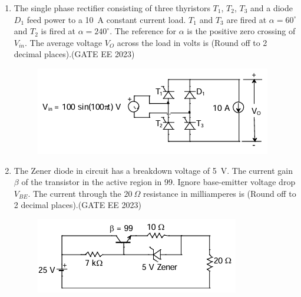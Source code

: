 \documentclass[a4paper,12pt]{exam}
\theoremstyle{remark}
\begin{document}
\begin{enumerate}
\item The single phase rectifier consisting of three thyristors $T_1$, $T_2$, $T_3$ and a diode $D_1$ feed power to a 10~A constant current load. $T_1$ and $T_3$ are fired at $\alpha = 60^\circ$ and $T_2$ is fired at $\alpha = 240^\circ$. The reference for $\alpha$ is the positive zero crossing of $V_{in}$. The average voltage $V_O$ across the load in volts is \underline{\hspace{3cm}} (Round off to 2 decimal places).\hfill{(GATE EE 2023)}
\begin{figure}[H]
    \centering
    \includegraphics[width=0.7\columnwidth]{figs/Q 58.png}
    \caption{}
    \label{fig:placeholder}
\end{figure}
\newpage
\item The Zener diode in circuit has a breakdown voltage of 5~V. The current gain $\beta$ of the transistor in the active region in 99. Ignore base-emitter voltage drop $V_{BE}$. The current through the $20~\Omega$ resistance in milliamperes is \underline{\hspace{3cm}} (Round off to 2 decimal places).\hfill{(GATE EE 2023)}
\begin{figure}[H]
    \centering
    \includegraphics[width=0.5\columnwidth]{figs/Q 59.png}
    \caption{}
    \label{fig:placeholder}
\end{figure}


\end{enumerate}
\end{document}

